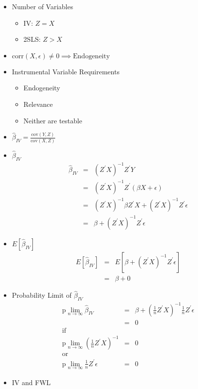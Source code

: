 \documentclass[11pt]{SelfArxOneColBMN}
\begin{document}
\begin{itemize}
  \item Number of Variables
  \begin{itemize}
    \item IV: $Z = X$
    \item 2SLS: $Z > X$
  \end{itemize}
  \item $\text{corr}(X,\epsilon) \neq 0 \implies \text{Endogeneity}$
  \item Instrumental Variable Requirements
  \begin{itemize}
    \item Endogeneity
    \item Relevance
    \item Neither are testable
  \end{itemize}
  \item $\hat{\beta}_{IV} = \frac{\text{cov}(Y,Z)}{\text{cov}(X,Z)}$
  \item $\hat{\beta}_{IV}$
  \begin{eqnarray*}
    \hat{\beta}_{IV} &=& (Z^\prime X)^{-1}Z^\prime Y\\
    &=& (Z^\prime X)^{-1}Z^\prime(\beta X + \epsilon)\\
    &=& (Z^\prime X)^{-1}\beta Z^\prime X + (Z^\prime X)^{-1}Z^\prime\epsilon\\
    &=& \beta + (Z^\prime X)^{-1}Z^\prime\epsilon
  \end{eqnarray*}
  \item $E[\hat{\beta}_{IV}]$
  \begin{eqnarray*}
    E[\hat{\beta}_{IV}] &=& E[\beta + (Z^\prime X)^{-1}Z^\prime\epsilon]\\
    &=& \beta + 0
  \end{eqnarray*}
  \item Probability Limit of $\hat{\beta}_{IV}$
  \begin{eqnarray*}
    \text{p}\lim_{n\rightarrow\infty}\hat{\beta}_{IV} &=& \beta + (\frac{1}{n}Z^\prime X)^{-1}\frac{1}{n}Z^{\prime}\epsilon\\
    &=& 0\\
    \text{if}\\
    \text{p}\lim_{n\rightarrow\infty}(\frac{1}{n}Z^\prime X)^{-1} &=& 0\\
    \text{or}\\
    \text{p}\lim_{n\rightarrow\infty}\frac{1}{n}Z^{\prime}\epsilon &=& 0
  \end{eqnarray*}
  \item IV and FWL
  \begin{eqnarray*}

\end{eqnarray*}
\end{itemize}
\end{document}
